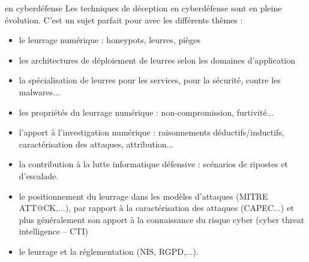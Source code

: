 \begin{techworkbox}{ en cyberdéfense}
Les techniques de déception en cyberdéfense sont en pleine évolution. C'est un sujet parfait pour \fichetech avec les différents thèmes  :
\begin{itemize}
  \item le leurrage numérique : honeypots, leurres, pièges
  \item 	les architectures de déploiement de leurres selon les domaines d'application
  \item 	la spécialisation de leurres pour les services, pour la sécurité, contre les malwares...
  \item 	les propriétés du leurrage numérique :  non-compromission,  furtivité...
  \item 	l'apport à l'investigation numérique : raisonnements déductifs/inductifs, caractérisation des attaques, attribution...
  \item 	la contribution à la lutte informatique défensive : scénarios de ripostes et d'escalade.
  \item 	le positionnement du leurrage dans les modèles d'attaques (MITRE ATT@CK,...), par rapport à la caractérisation des attaques (CAPEC...) et plus généralement son apport à la connaissance du risque cyber (cyber threat intelligence – CTI)
  \item 	le leurrage et la réglementation (NIS, RGPD,...).
\end{itemize}

\end{techworkbox}









